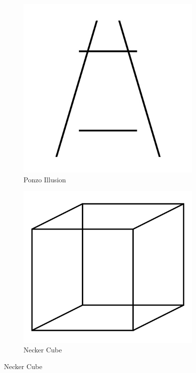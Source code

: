 \documentclass[11pt]{isuthesis}\usepackage[]{graphicx}\usepackage[]{color}
\begin{document}
\begin{figure}[htbp]\centering
\hfil
\begin{subfigure}[b]{.4\textwidth}\centering
  \includegraphics[width=\textwidth]{PonzoIllusion}
  \caption{Ponzo Illusion}\label{fig:Ponzo}
\end{subfigure}\hfill
\begin{subfigure}[b]{.4\textwidth}\centering
  \includegraphics[width=\textwidth]{NeckerCube}
  \caption{Necker Cube}\label{fig:NeckerCube}
\end{subfigure}\hfil


\end{figure}
\end{document}
